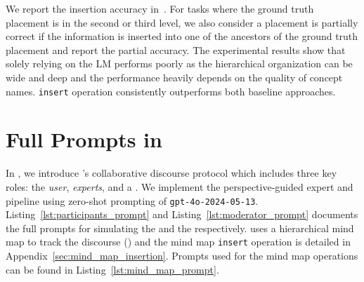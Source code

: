 \documentclass[11pt]{article}
\begin{document}
We report the insertion accuracy in~. For tasks where the ground truth placement is in the second or third level, we also consider a placement is partially correct if the information is inserted into one of the ancestors of the ground truth placement and report the partial accuracy. The experimental results show that solely relying on the LM performs poorly as the hierarchical organization can be wide and deep and the performance heavily depends on the quality of concept names. \system \texttt{insert} operation consistently outperforms both baseline approaches.


\section{Full Prompts in \system}
\label{appendix:prompts}
In , we introduce \system’s collaborative discourse protocol which includes three key roles: the \textit{user}, \textit{experts}, and a \textit{\moderator}. We implement the perspective-guided expert and \moderator pipeline using zero-shot prompting of \texttt{gpt-4o-2024-05-13}. Listing~\ref{lst:participants_prompt} and Listing~\ref{lst:moderator_prompt} documents the full prompts for simulating the \expert and the \moderator respectively. \system uses a hierarchical mind map to track the discourse () and the mind map \texttt{insert} operation is detailed in Appendix~\ref{sec:mind_map_insertion}. %
Prompts used for the mind map operations can be found in Listing~\ref{lst:mind_map_prompt}. 
\end{document}
